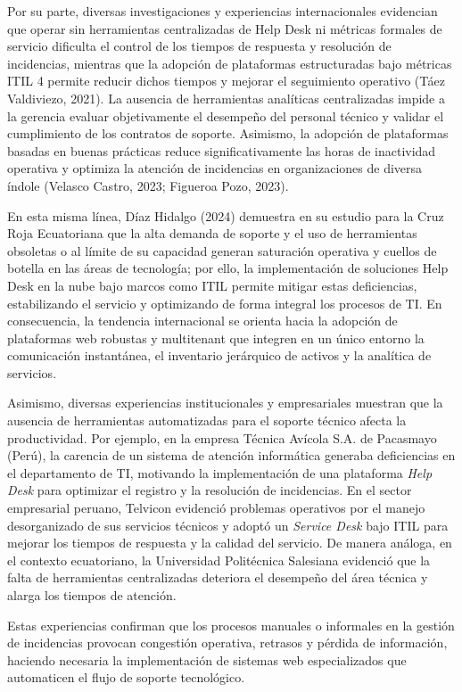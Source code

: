 Por su parte, diversas investigaciones y experiencias internacionales evidencian que operar sin herramientas centralizadas de Help Desk ni métricas formales de servicio dificulta el control de los tiempos de respuesta y resolución de incidencias, mientras que la adopción de plataformas estructuradas bajo métricas ITIL 4 permite reducir dichos tiempos y mejorar el seguimiento operativo (Táez Valdiviezo, 2021). La ausencia de herramientas analíticas centralizadas impide a la gerencia evaluar objetivamente el desempeño del personal técnico y validar el cumplimiento de los contratos de soporte. Asimismo, la adopción de plataformas basadas en buenas prácticas reduce significativamente las horas de inactividad operativa y optimiza la atención de incidencias en organizaciones de diversa índole (Velasco Castro, 2023; Figueroa Pozo, 2023).

En esta misma línea, Díaz Hidalgo (2024) demuestra en su estudio para la Cruz Roja Ecuatoriana que la alta demanda de soporte y el uso de herramientas obsoletas o al límite de su capacidad generan saturación operativa y cuellos de botella en las áreas de tecnología; por ello, la implementación de soluciones Help Desk en la nube bajo marcos como ITIL permite mitigar estas deficiencias, estabilizando el servicio y optimizando de forma integral los procesos de TI. En consecuencia, la tendencia internacional se orienta hacia la adopción de plataformas web robustas y multitenant que integren en un único entorno la comunicación instantánea, el inventario jerárquico de activos y la analítica de servicios.

Asimismo, diversas experiencias institucionales y empresariales muestran que la ausencia de herramientas automatizadas para el soporte técnico afecta la productividad. Por ejemplo, en la empresa Técnica Avícola S.A. de Pacasmayo (Perú), la carencia de un sistema de atención informática generaba deficiencias en el departamento de TI, motivando la implementación de una plataforma \textit{Help Desk} para optimizar el registro y la resolución de incidencias. En el sector empresarial peruano, Telvicon evidenció problemas operativos por el manejo desorganizado de sus servicios técnicos y adoptó un \textit{Service Desk} bajo ITIL para mejorar los tiempos de respuesta y la calidad del servicio. De manera análoga, en el contexto ecuatoriano, la Universidad Politécnica Salesiana evidenció que la falta de herramientas centralizadas deteriora el desempeño del área técnica y alarga los tiempos de atención.

Estas experiencias confirman que los procesos manuales o informales en la gestión de incidencias provocan congestión operativa, retrasos y pérdida de información, haciendo necesaria la implementación de sistemas web especializados que automaticen el flujo de soporte tecnológico.
\vspace{0.8em}

